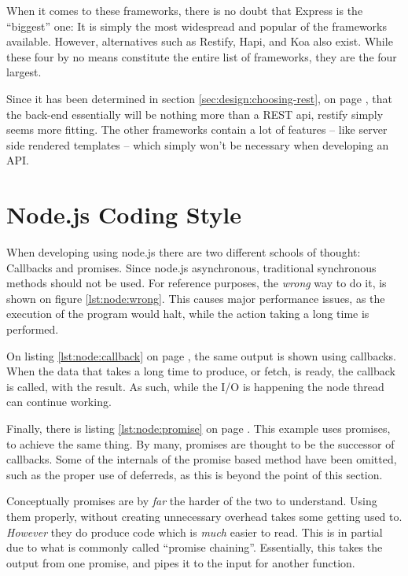 		When it comes to these frameworks, there is no doubt that Express is the ``biggest'' one: It is simply the most widespread and popular of the frameworks available. However, alternatives such as Restify, Hapi, and Koa also exist. While these four by no means constitute the entire list of frameworks, they are the four largest.

		Since it has been determined in section \ref{sec:design:choosing-rest}, on page \pageref{sec:design:choosing-rest}, that the back-end essentially will be nothing more than a REST api, restify simply seems more fitting. The other frameworks contain a lot of features -- like server side rendered templates -- which simply won't be necessary when developing an API. 

	\section{Node.js Coding Style}
		\label{sec:impl:node:style}
		When developing using node.js there are two different schools of thought: Callbacks and promises. Since node.js asynchronous, traditional synchronous methods should not be used. For reference purposes, the \emph{wrong} way to do it, is shown on figure \ref{lst:node:wrong}. This causes major performance issues, as the execution of the program would halt, while the action taking a long time is performed.

		On listing \ref{lst:node:callback} on page \pageref{lst:node:callback}, the same output is shown using callbacks. When the data that takes a long time to produce, or fetch, is ready, the callback is called, with the result. As such, while the I/O is happening the node thread can continue working.

		Finally, there is listing \ref{lst:node:promise} on page \pageref{lst:node:callback}. This example uses promises, to achieve the same thing. By many, promises are thought to be the successor of callbacks. Some of the internals of the promise based method have been omitted, such as the proper use of deferreds, as this is beyond the point of this section.

		Conceptually promises are by \emph{far} the harder of the two to understand. Using them properly, without creating unnecessary overhead takes some getting used to. \emph{However} they do produce code which is \emph{much} easier to read. This is in partial due to what is commonly called ``promise chaining''. Essentially, this takes the output from one promise, and pipes it to the input for another function. 

